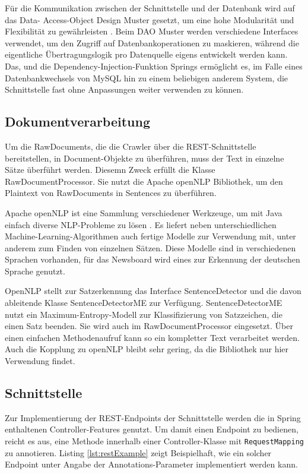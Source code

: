 Für die Kommunikation zwischen der Schnittstelle und der Datenbank wird auf das Data-
Access-Object Design Muster gesetzt, um eine hohe Modularität und Flexibilität zu
gewährleisten \cite{dao-pattern}. Beim DAO Muster werden verschiedene Interfaces
verwendet, um den Zugriff auf Datenbankoperationen zu maskieren, während die eigentliche
Übertragungslogik pro Datenquelle eigens entwickelt werden kann. Das, und die
Dependency-Injection-Funktion Springs ermöglicht es, im Falle eines Datenbankwechsels von
MySQL hin zu einem beliebigen anderem System, die Schnittstelle fast ohne Anpassungen
weiter verwenden zu können.

\subsection{Dokumentverarbeitung}
Um die RawDocuments, die die Crawler über die REST-Schnittstelle bereitstellen,
in Document-Objekte zu überführen, muss der Text in einzelne Sätze überführt werden.
Diesemn Zweck erfüllt die Klasse RawDocumentProcessor. Sie nutzt die
Apache openNLP Bibliothek, um den Plaintext von RawDocuments in Sentences zu überführen.

Apache openNLP ist eine Sammlung verschiedener Werkzeuge, um mit Java einfach diverse 
NLP-Probleme zu lösen \cite{opennlp}. Es liefert neben unterschiedlichen 
Machine-Learning-Algorithmen auch fertige Modelle zur Verwendung mit, unter anderem
zum Finden von einzelnen Sätzen. Diese Modelle sind in verschiedenen Sprachen vorhanden,
für das Newsboard wird eines zur Erkennung der deutschen Sprache genutzt.

OpenNLP stellt zur Satzerkennung das Interface SentenceDetector und die davon ableitende
Klasse SentenceDetectorME zur Verfügung. SentenceDetectorME nutzt ein Maximum-Entropy-Modell
zur Klassifizierung von Satzzeichen, die einen Satz beenden. Sie wird auch im
RawDocumentProcessor eingesetzt. Über einen einfachen Methodenaufruf kann so ein kompletter
Text verarbeitet werden. Auch die Kopplung zu openNLP bleibt sehr gering, da die
Bibliothek nur hier Verwendung findet.

\subsection{Schnittstelle}
Zur Implementierung der REST-Endpoints der Schnittstelle werden die in Spring enthaltenen
Controller-Features genutzt. Um damit einen Endpoint zu bedienen, reicht es aus,
eine Methode innerhalb einer Controller-Klasse mit \texttt{RequestMapping} zu annotieren.
Listing \ref{lst:restExample} zeigt Beispielhaft, wie ein solcher Endpoint unter Angabe der
Annotations-Parameter implementiert werden kann.

